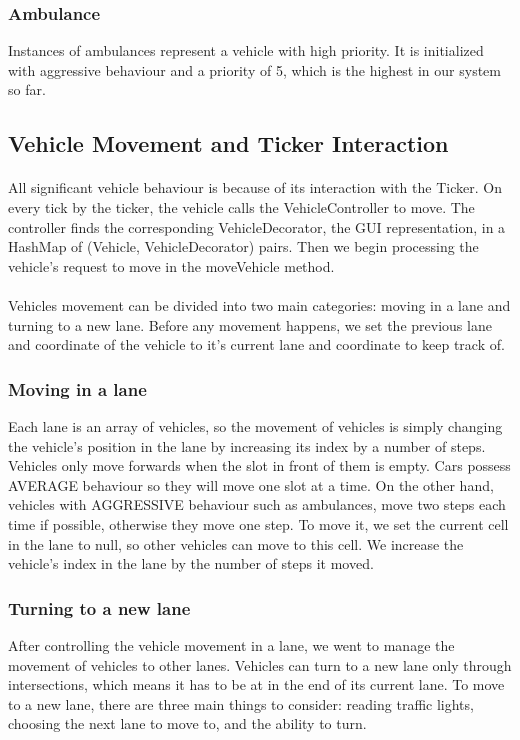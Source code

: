 \documentclass[a4paper,11pt,titlepage]{article}
\begin{document}
\subsubsection{Ambulance}
Instances of ambulances represent a vehicle with high priority. It is initialized with aggressive behaviour and a priority of 5, which is the highest in our system so far.
\subsection{Vehicle Movement and Ticker Interaction}
\paragraph{}
All significant vehicle behaviour is because of its interaction with the Ticker. On every tick by the ticker, the vehicle calls the VehicleController to move. The controller finds the corresponding VehicleDecorator, the GUI representation, in a HashMap of (Vehicle, VehicleDecorator) pairs. Then we begin processing the vehicle's request to move in the moveVehicle method.
\paragraph{}
Vehicles movement can be divided into two main categories: moving in a lane and turning to a new lane. Before any movement happens, we set the previous lane and coordinate of the vehicle to it's current lane and coordinate to keep track of.
\subsubsection{Moving in a lane}
Each lane is an array of vehicles, so the movement of vehicles is simply changing the vehicle's position in the lane by increasing its index by a number of steps. Vehicles only move forwards when the slot in front of them is empty. Cars possess AVERAGE behaviour so they will move one slot at a time. On the other hand, vehicles with AGGRESSIVE behaviour such as ambulances, move two steps each time if possible, otherwise they move one step.
To move it, we set the current cell in the lane to null, so other vehicles can move to this cell. We increase the vehicle's index in the lane by the number of steps it moved.
\subsubsection{Turning to a new lane}
After controlling the vehicle movement in a lane, we went to manage the movement of vehicles to other lanes. Vehicles can turn to a new lane only through intersections, which means it has to be at in the end of its current lane. To move to a new lane, there are three main things to consider: reading traffic lights, choosing the next lane to move to, and the ability to turn.
\end{document}

